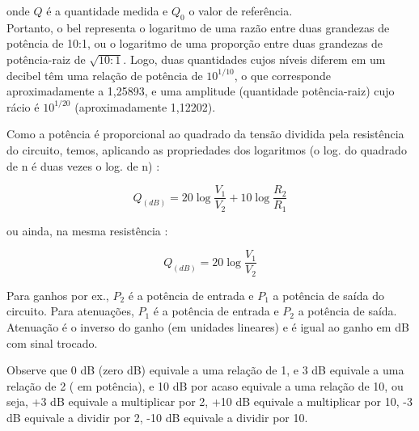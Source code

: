     onde $Q$ é a quantidade medida e $Q_0$ o valor de referência.\\
    
    Portanto, o bel representa o logaritmo de uma razão entre duas grandezas de potência de 10:1, ou o logaritmo de uma proporção entre duas grandezas de potência-raiz de $\sqrt{10:1}$. Logo, duas quantidades cujos níveis diferem em um decibel têm uma relação de potência de $10^{1/10}$, o que corresponde aproximadamente a 1,25893, e uma amplitude (quantidade potência-raiz) cujo rácio é $10^{1/20}$ (aproximadamente 1,12202).
    
        Como a potência é proporcional ao quadrado da tensão dividida pela
    resistência do circuito, temos, aplicando as propriedades dos logaritmos (o log.
    do quadrado de n é duas vezes o log. de n) :
    
    \begin{equation*}
        Q_{(dB)} = 20 \log \frac{V_1}{V_2} + 10 \log \frac{R_2}{R_1}
    \end{equation*}
    
    ou ainda, na mesma resistência :
    
    \begin{equation*}
        Q_{(dB)} = 20 \log \frac{V_1}{V_2}
    \end{equation*}
    
        Para ganhos por ex., $P_2$ é a potência de entrada e $P_1$ a potência de saída do
    circuito.
        Para atenuações, $P_1$ é a potência de entrada e $P_2$ a potência de saída.
    Atenuação é o inverso do ganho (em unidades lineares) e é igual ao ganho em
    dB com sinal trocado.
    
    
    
    Observe que 0 dB (zero dB) equivale a uma relação de 1, e 3 dB equivale a uma relação de 2 ( em potência), e 10 dB por acaso equivale a uma relação de 10, ou seja, +3 dB equivale a multiplicar por 2, +10 dB equivale a multiplicar por 10, -3 dB equivale a dividir por 2, -10 dB equivale a dividir por 10.
    
    
